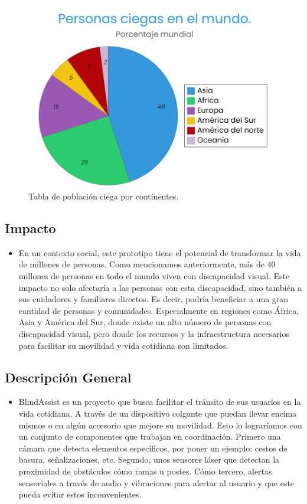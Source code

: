 \documentclass[12pt,a4paper]{article}
\begin{document}
\begin{figure}[H]
    \centering
    \includegraphics[width=0.8\linewidth]{Carpeta tecnica/graf1.png}
    \caption{Tabla de población ciega por continentes.}
\end{figure}

\subsection{Impacto}
 \begin{itemize}
 
\item En un contexto social, este prototipo tiene el potencial de transformar la vida de millones de personas. Como mencionamos anteriormente, más de 40 millones de personas en todo el mundo viven con discapacidad visual. Este impacto no solo afectaría a las personas con esta discapacidad, sino también a sus cuidadores y familiares directos. Es decir, podría beneficiar a una gran cantidad de personas y comunidades. Especialmente en regiones como África, Asia y América del Sur, donde existe un alto número de personas con discapacidad visual, pero donde los recursos y la infraestructura necesarios para facilitar su movilidad y vida cotidiana son limitados.

     
 \end{itemize}

\subsection{Descripción General}

\begin{itemize}

    \item BlindAssist es un proyecto que busca facilitar el tránsito de sus usuarios en la vida cotidiana. A través de un dispositivo colgante que puedan llevar encima mismos o en algún accesorio que mejore su movilidad. Esto lo lograríamos con un conjunto de componentes que trabajan en coordinación. Primero una cámara que detecta elementos específicos, por poner un ejemplo: cestos de basura, señalizaciones, etc. Segundo, unos sensores láser que detectan la proximidad de obstáculos cómo ramas u postes. Cómo tercero, alertas sensoriales a través de audio y vibraciones para alertar al usuario y que este pueda evitar estos inconvenientes.
    
\end{itemize}
\end{document}
